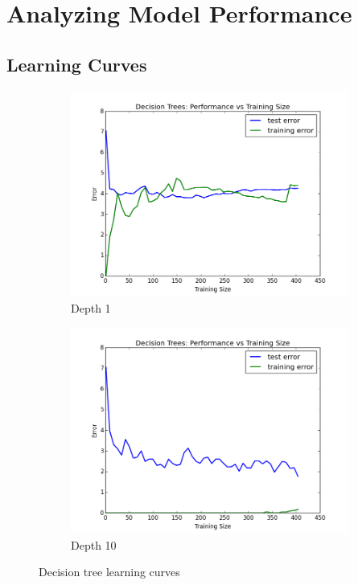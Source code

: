 \documentclass{article}
\begin{document}
	\section{Analyzing Model Performance}
	\subsection{Learning Curves}
	\begin{figure}[h]
		\centering
		\begin{subfigure}[b]{0.45\textwidth}
			\includegraphics[width=\textwidth]{decision_tree_error_graph_depth_1}
			\caption{Depth 1}
			\label{fig:decisionTreeDepth1}
		\end{subfigure}
		\begin{subfigure}[b]{0.45\textwidth}
			\includegraphics[width=\textwidth]{decision_tree_error_graph_depth_10}
			\caption{Depth 10}
			\label{fig:decisionTreeDepth10}
		\end{subfigure}
		\caption{Decision tree learning curves}
	\end{figure}
\end{document}
